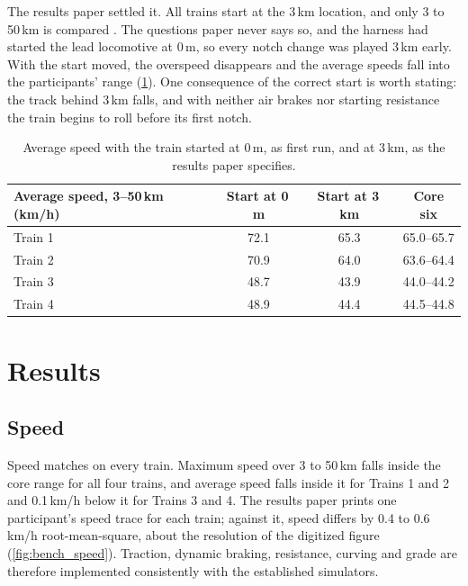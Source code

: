 The results paper settled it. All trains start at the 3\,km location, and only 3 to 50\,km is compared \cite{Wu2018BenchmarkResults}. The questions paper never says so, and the harness had started the lead locomotive at 0\,m, so every notch change was played 3\,km early. With the start moved, the overspeed disappears and the average speeds fall into the participants' range (\cref{tab:bench_start}). One consequence of the correct start is worth stating: the track behind 3\,km falls, and with neither air brakes nor starting resistance the train begins to roll before its first notch.

\begin{table}[htbp]
    \centering
    \small
    \begin{tabular}{lccc}
        \toprule
        Average speed, 3--50\,km (km/h) & Start at 0\,m & Start at 3\,km & Core six \\
        \midrule
        Train 1 & 72.1 & 65.3 & 65.0--65.7 \\
        Train 2 & 70.9 & 64.0 & 63.6--64.4 \\
        Train 3 & 48.7 & 43.9 & 44.0--44.2 \\
        Train 4 & 48.9 & 44.4 & 44.5--44.8 \\
        \bottomrule
    \end{tabular}
    \caption{Average speed with the train started at 0\,m, as first run, and at 3\,km, as the results paper specifies.}
    \label{tab:bench_start}
\end{table}

\section{Results}
\label{sec:bench_results}

\subsection{Speed}

Speed matches on every train. Maximum speed over 3 to 50\,km falls inside the core range for all four trains, and average speed falls inside it for Trains 1 and 2 and 0.1\,km/h below it for Trains 3 and 4. The results paper prints one participant's speed trace for each train; against it, speed differs by 0.4 to 0.6\,km/h root-mean-square, about the resolution of the digitized figure (\cref{fig:bench_speed}). Traction, dynamic braking, resistance, curving and grade are therefore implemented consistently with the established simulators.

